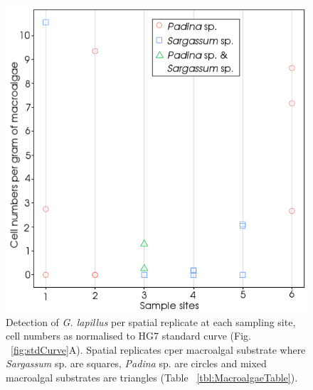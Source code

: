 \documentclass[12pt]{article}
\begin{document}
\begin{figure} 
\includegraphics[scale=.85]{Hero_qpcr-figs/Fig5_Env-sites-May18.png} 
\caption{Detection of \emph{G. lapillus} per spatial replicate at each sampling site, cell numbers as normalised to HG7 standard curve (Fig. ~\ref{fig:stdCurve}A). Spatial replicates cper macroalgal substrate where \emph{Sargassum} sp. are squares, \emph{Padina} sp. are circles and mixed macroalgal substrates are triangles (Table ~\ref{tbl:MacroalgaeTable}).} 
\label{fig:envHG7}
\end{figure} 
\FloatBarrier
\FloatBarrier

\newpage
\end{document}
